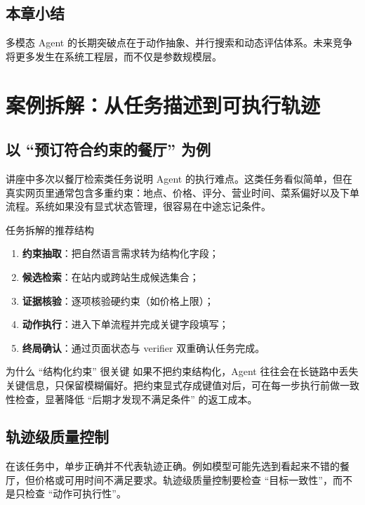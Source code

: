 \documentclass[a4paper]{article}
\begin{document}
\subsection{本章小结}
多模态 Agent 的长期突破点在于动作抽象、并行搜索和动态评估体系。未来竞争将更多发生在系统工程层，而不仅是参数规模层。

\section{案例拆解：从任务描述到可执行轨迹}

\subsection{以 ``预订符合约束的餐厅'' 为例}
讲座中多次以餐厅检索类任务说明 Agent 的执行难点。这类任务看似简单，但在真实网页里通常包含多重约束：地点、价格、评分、营业时间、菜系偏好以及下单流程。系统如果没有显式状态管理，很容易在中途忘记条件。

\begin{importantbox}{任务拆解的推荐结构}
\begin{enumerate}
    \item \textbf{约束抽取}：把自然语言需求转为结构化字段；
    \item \textbf{候选检索}：在站内或跨站生成候选集合；
    \item \textbf{证据核验}：逐项核验硬约束（如价格上限）；
    \item \textbf{动作执行}：进入下单流程并完成关键字段填写；
    \item \textbf{终局确认}：通过页面状态与 verifier 双重确认任务完成。
\end{enumerate}
\end{importantbox}

\begin{knowledgebox}{为什么 ``结构化约束'' 很关键}
如果不把约束结构化，Agent 往往会在长链路中丢失关键信息，只保留模糊偏好。把约束显式存成键值对后，可在每一步执行前做一致性检查，显著降低 ``后期才发现不满足条件'' 的返工成本。
\end{knowledgebox}

\subsection{轨迹级质量控制}
在该任务中，单步正确并不代表轨迹正确。例如模型可能先选到看起来不错的餐厅，但价格或可用时间不满足要求。轨迹级质量控制要检查 ``目标一致性''，而不是只检查 ``动作可执行性''。
\end{document}
